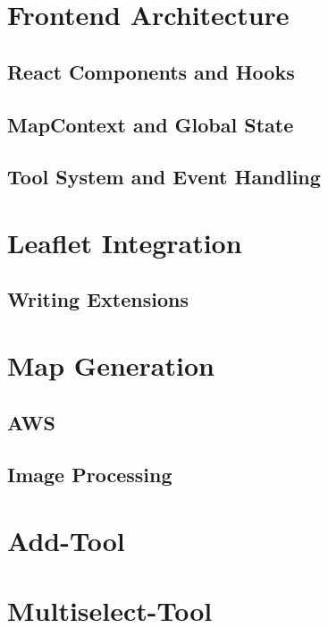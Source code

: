 \section{Frontend Architecture}

\subsection{React Components and Hooks}

\subsection{MapContext and Global State}

\subsection{Tool System and Event Handling}

\section{Leaflet Integration}

\subsection{Writing Extensions}

\section{Map Generation}

\subsection{AWS}

\subsection{Image Processing}

\section{Add-Tool}

\section{Multiselect-Tool}

